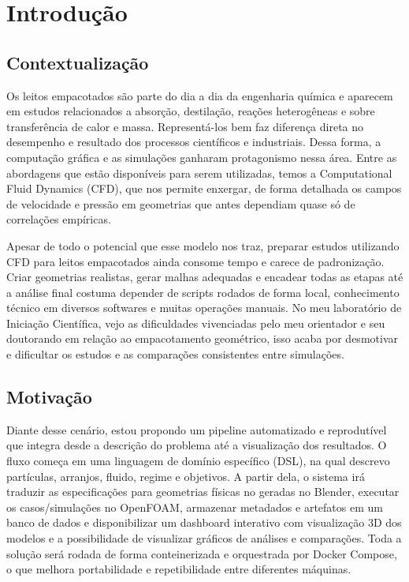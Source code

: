 \chapter{Introdução}
\label{cap:introducao}

\section{Contextualização}

Os leitos empacotados são parte do dia a dia da engenharia química e aparecem em estudos relacionados a absorção, destilação, reações heterogêneas e sobre transferência de calor e massa. Representá-los bem faz diferença direta no desempenho e resultado dos processos científicos e industriais. Dessa forma, a computação gráfica e as simulações ganharam protagonismo nessa área. Entre as abordagens que estão disponíveis para serem utilizadas, temos a Computational Fluid Dynamics (CFD), que nos permite enxergar, de forma detalhada os campos de velocidade e pressão em geometrias que antes dependiam quase só de correlações empíricas.

Apesar de todo o potencial que esse modelo nos traz, preparar estudos utilizando CFD para leitos empacotados ainda consome tempo e carece de padronização. Criar geometrias realistas, gerar malhas adequadas e encadear todas as etapas até a análise final costuma depender de scripts rodados de forma local, conhecimento técnico em diversos softwares e muitas operações manuais. No meu laboratório de Iniciação Científica, vejo as dificuldades vivenciadas pelo meu orientador e seu doutorando em relação ao empacotamento geométrico, isso acaba por desmotivar e dificultar os estudos e as comparações consistentes entre simulações.

\section{Motivação}

Diante desse cenário, estou propondo um pipeline automatizado e reprodutível que integra desde a descrição do problema até a visualização dos resultados. O fluxo começa em uma linguagem de domínio específico (DSL), na qual descrevo partículas, arranjos, fluido, regime e objetivos. A partir dela, o sistema irá traduzir as especificações para geometrias físicas no geradas no Blender, executar os casos/simulações no OpenFOAM, armazenar metadados e artefatos em um banco de dados e disponibilizar um dashboard interativo com visualização 3D dos modelos e a possibilidade de visualizar gráficos de análises e comparações. Toda a solução será rodada de forma conteinerizada e orquestrada por Docker Compose, o que melhora portabilidade e repetibilidade entre diferentes máquinas.

